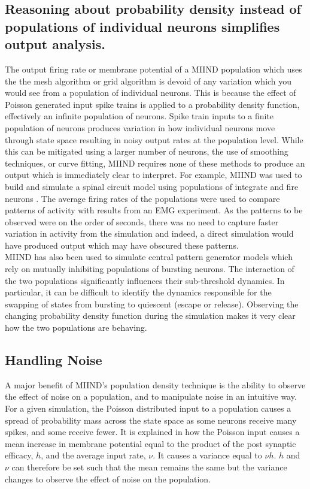 \documentclass[utf8]{frontiersSCNS} %
\begin{document}
\subsection*{Reasoning about probability density instead of populations of individual neurons simplifies output analysis.}
The output firing rate or membrane potential of a MIIND population which uses the the mesh algorithm or grid algorithm is devoid of any variation which you would see from a population of individual neurons. This is because the effect of Poisson generated input spike trains is applied to a probability density function, effectively an infinite population of neurons. Spike train inputs to a finite population of neurons produces variation in how individual neurons move through state space resulting in noisy output rates at the population level. While this can be mitigated using a larger number of neurons, the use of smoothing techniques, or curve fitting, MIIND requires none of these methods to produce an output which is immediately clear to interpret. For example, MIIND was used to build and simulate a spinal circuit model using populations of integrate and fire neurons \citep{york2019muscles}. The average firing rates of the populations were used to compare patterns of activity with results from an EMG experiment. As the patterns to be observed were on the order of seconds, there was no need to capture faster variation in activity from the simulation and indeed, a direct simulation would have produced output which may have obscured these patterns.\\

MIIND has also been used to simulate central pattern generator models which rely on mutually inhibiting populations of bursting neurons. The interaction of the two populations significantly influences their sub-threshold dynamics. In particular, it can be difficult to identify the dynamics responsible for the swapping of states from bursting to quiescent (escape or release). Observing the changing probability density function during the simulation makes it very clear how the two populations are behaving.\\

\subsection*{Handling Noise}
\label{handlingnoise}
A major benefit of MIIND's population density technique is the ability to observe the effect of noise on a population, and to manipulate noise in an intuitive way. For a given simulation, the Poisson distributed input to a population causes a spread of probability mass across the state space as some neurons receive many spikes, and some receive fewer. It is explained in \cite{de2013generic} how the Poisson input causes a mean increase in membrane potential equal to the product of the post synaptic efficacy, $h$, and the average input rate, $\nu$. It causes a variance equal to $\nu h$\texttwosuperior. $h$ and $\nu$ can therefore be set such that the mean remains the same but the variance changes to observe the effect of noise on the population.\\
\end{document}
